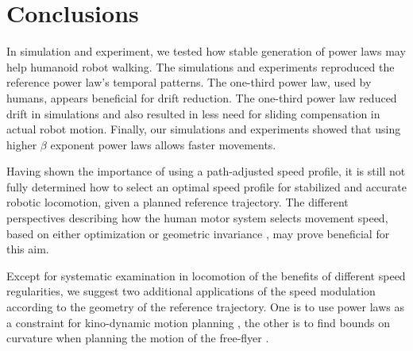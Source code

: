 \section{Conclusions}

In simulation and experiment, we tested how stable generation of power laws may help humanoid robot walking. 
The simulations and experiments reproduced the reference power law's temporal patterns.
The one-third power law, used by humans, appears beneficial for drift reduction. The one-third power law reduced drift in simulations and also resulted in less need for sliding compensation in actual robot motion.
Finally, our simulations and experiments showed that using higher $\beta$ exponent power laws allows faster movements. 

Having shown the importance of using a path-adjusted speed profile, it is still not fully determined how to select an optimal speed profile for stabilized and accurate robotic locomotion, given a planned reference trajectory. The different perspectives describing how the human motor system selects movement speed, based on either optimization \cite{flash_coordination_1985,todorov_optimal_2002} or geometric invariance \cite{flash_affine_2007,bennequin_movement_2009}, may prove beneficial for this aim. 


Except for systematic examination in locomotion of the benefits of different speed regularities, we suggest two additional applications of the speed modulation according to the geometry of the reference trajectory. One is to use power laws as a constraint for kino-dynamic motion planning  \cite{Pham:rss:2009}, the other is to find bounds on curvature when planning the motion of the free-flyer \cite{Orthey:PhD:2015}. 

